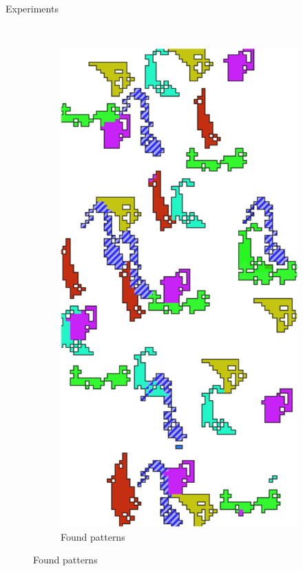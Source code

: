 \documentclass[11pt]{beamer}
\begin{document}
\begin{frame}{Experiments}
\begin{figure}[t]
\begin{subfigure}[t]{0.25\textwidth}
\label{fig:rilb}
\end{subfigure}%
~
\begin{subfigure}[t]{0.25\textwidth}
\centering
\includegraphics[scale=.8]{exp_result_2.png}
\caption{Found patterns}

\end{subfigure}
\end{figure}
\end{frame}
\end{document}
